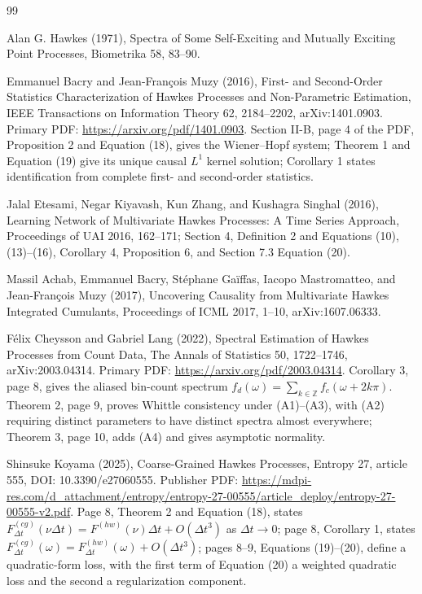 \documentclass{article}
\begin{document}
\begin{thebibliography}{99}

   Alan G. Hawkes (1971), Spectra of Some Self-Exciting and Mutually Exciting Point Processes, Biometrika 58, 83--90.

   Emmanuel Bacry and Jean-Fran\c{c}ois Muzy (2016), First- and Second-Order Statistics Characterization of Hawkes Processes and Non-Parametric Estimation, IEEE Transactions on Information Theory 62, 2184--2202, arXiv:1401.0903. Primary PDF: \url{https://arxiv.org/pdf/1401.0903}. Section II-B, page 4 of the PDF, Proposition 2 and Equation (18), gives the Wiener--Hopf system; Theorem 1 and Equation (19) give its unique causal \(L^1\) kernel solution; Corollary 1 states identification from complete first- and second-order statistics.

   Jalal Etesami, Negar Kiyavash, Kun Zhang, and Kushagra Singhal (2016), Learning Network of Multivariate Hawkes Processes: A Time Series Approach, Proceedings of UAI 2016, 162--171; Section 4, Definition 2 and Equations (10), (13)--(16), Corollary 4, Proposition 6, and Section 7.3 Equation (20).

   Massil Achab, Emmanuel Bacry, St\'{e}phane Ga\"iffas, Iacopo Mastromatteo, and Jean-Fran\c{c}ois Muzy (2017), Uncovering Causality from Multivariate Hawkes Integrated Cumulants, Proceedings of ICML 2017, 1--10, arXiv:1607.06333.

   F\'{e}lix Cheysson and Gabriel Lang (2022), Spectral Estimation of Hawkes Processes from Count Data, The Annals of Statistics 50, 1722--1746, arXiv:2003.04314. Primary PDF: \url{https://arxiv.org/pdf/2003.04314}. Corollary 3, page 8, gives the aliased bin-count spectrum \(f_d(\omega)=\sum_{k\in\mathbb Z}f_c(\omega+2k\pi)\). Theorem 2, page 9, proves Whittle consistency under (A1)--(A3), with (A2) requiring distinct parameters to have distinct spectra almost everywhere; Theorem 3, page 10, adds (A4) and gives asymptotic normality.

   Shinsuke Koyama (2025), Coarse-Grained Hawkes Processes, Entropy 27, article 555, DOI: 10.3390/e27060555. Publisher PDF: \url{https://mdpi-res.com/d\_attachment/entropy/entropy-27-00555/article\_deploy/entropy-27-00555-v2.pdf}. Page 8, Theorem 2 and Equation (18), states \(F_{\Delta t}^{(cg)}(\nu\Delta t)=F^{(hw)}(\nu)\Delta t+O(\Delta t^3)\) as \(\Delta t\to0\); page 8, Corollary 1, states \(F_{\Delta t}^{(cg)}(\omega)=F_{\Delta t}^{(hw)}(\omega)+O(\Delta t^3)\); pages 8--9, Equations (19)--(20), define a quadratic-form loss, with the first term of Equation (20) a weighted quadratic loss and the second a regularization component.


\end{thebibliography}
\end{document}
